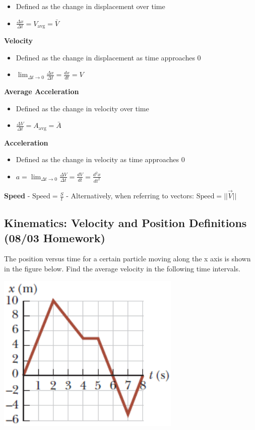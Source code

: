 \documentclass[
  letterpaper,
  DIV=11,
  numbers=noendperiod]{scrartcl}
\providecommand{\tightlist}{%
  \setlength{\itemsep}{0pt}\setlength{\parskip}{0pt}}\usepackage{longtable,booktabs,array}
\begin{document}
\begin{itemize}
\tightlist
\item
  Defined as the change in displacement over time
\item
  \(\frac{\Delta x}{\Delta t} = V_\text{avg} = \bar{V}\)
\end{itemize}

\textbf{Velocity}

\begin{itemize}
\tightlist
\item
  Defined as the change in displacement as time approaches 0
\item
  \(\lim_{\Delta t \to 0} \frac{\Delta x}{\Delta t} = \frac{dx}{dt} = V\)
\end{itemize}

\textbf{Average Acceleration}

\begin{itemize}
\tightlist
\item
  Defined as the change in velocity over time
\item
  \(\frac{\Delta V}{\Delta t} = A_\text{avg} = \bar{A}\)
\end{itemize}

\textbf{Acceleration}

\begin{itemize}
\tightlist
\item
  Defined as the change in velocity as time approaches 0
\item
  \(a = \lim_{\Delta t \to 0} \frac{\Delta V}{\Delta t} = \frac{dV}{dt} = \frac{d^2x}{dt^2}\)
\end{itemize}

\textbf{Speed} - \(\text{Speed} = \frac{S}{t}\) - Alternatively, when
referring to vectors: \(\text{Speed} = ||\vec{V}||\)

\hypertarget{kinematics-velocity-and-position-definitions-0803-homework}{%
\subsection{Kinematics: Velocity and Position Definitions (08/03
Homework)}\label{kinematics-velocity-and-position-definitions-0803-homework}}

The position versus time for a certain particle moving along the x axis
is shown in the figure below. Find the average velocity in the following
time intervals.

\includegraphics{img/Kinematics Velocity and Position HW/problem1.png}
\end{document}
